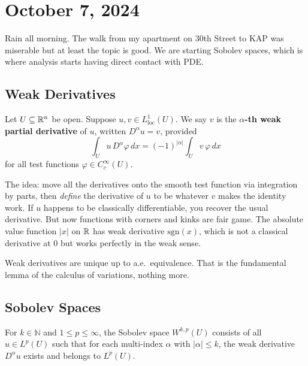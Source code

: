 
\section{October 7, 2024}

Rain all morning. The walk from my apartment on 30th Street to KAP was miserable but at least the topic is good. We are starting Sobolev spaces, which is where analysis starts having direct contact with PDE.

\subsection{Weak Derivatives}

\begin{definition}
\label{def:weak-deriv}
Let $U \subseteq \mathbb{R}^n$ be open. Suppose $u, v \in L^1_{\mathrm{loc}}(U)$. We say $v$ is the \textbf{$\alpha$-th weak partial derivative} of $u$, written $D^\alpha u = v$, provided
\[
    \int_U u \, D^\alpha \varphi \, dx = (-1)^{|\alpha|} \int_U v \, \varphi \, dx
\]
for all test functions $\varphi \in C^\infty_c(U)$.
\end{definition}

The idea: move all the derivatives onto the smooth test function via integration by parts, then \emph{define} the derivative of $u$ to be whatever $v$ makes the identity work. If $u$ happens to be classically differentiable, you recover the usual derivative. But now functions with corners and kinks are fair game. The absolute value function $|x|$ on $\mathbb{R}$ has weak derivative $\mathrm{sgn}(x)$, which is not a classical derivative at $0$ but works perfectly in the weak sense.

Weak derivatives are unique up to a.e.\ equivalence. That is the fundamental lemma of the calculus of variations, nothing more.


\subsection{Sobolev Spaces}

\begin{definition}
\label{def:sobolev-space}
For $k \in \mathbb{N}$ and $1 \leq p \leq \infty$, the Sobolev space $W^{k,p}(U)$ consists of all $u \in L^p(U)$ such that for each multi-index $\alpha$ with $|\alpha| \leq k$, the weak derivative $D^\alpha u$ exists and belongs to $L^p(U)$.
\end{definition}

